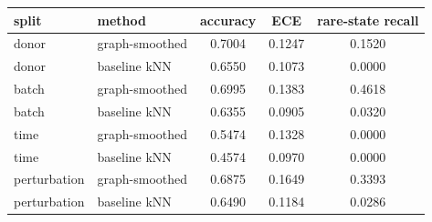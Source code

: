 \begin{tabular}{llccc}
\toprule
split & method & accuracy & ECE & rare-state recall \\
\midrule
donor & graph-smoothed & 0.7004 & 0.1247 & 0.1520 \\
donor & baseline kNN & 0.6550 & 0.1073 & 0.0000 \\
batch & graph-smoothed & 0.6995 & 0.1383 & 0.4618 \\
batch & baseline kNN & 0.6355 & 0.0905 & 0.0320 \\
time & graph-smoothed & 0.5474 & 0.1328 & 0.0000 \\
time & baseline kNN & 0.4574 & 0.0970 & 0.0000 \\
perturbation & graph-smoothed & 0.6875 & 0.1649 & 0.3393 \\
perturbation & baseline kNN & 0.6490 & 0.1184 & 0.0286 \\
\bottomrule
\end{tabular}
